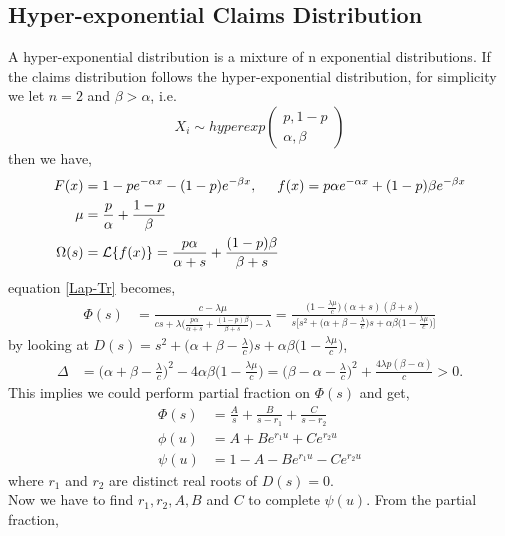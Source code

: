 \documentclass[12pt]{article}
\begin{document}
\subsection{Hyper-exponential Claims Distribution}
A hyper-exponential distribution is a mixture of n exponential distributions. If the claims distribution follows the hyper-exponential distribution, for simplicity we let \(n=2\) and \(\beta>\alpha\), i.e. 
\[X_i\sim hyperexp \begin{pmatrix}{p,1-p}\\{\alpha,\beta}\end{pmatrix}\]
then we have,
\begin{align*}
    F(x)&=1-pe^{-\alpha x}-(1-p)e^{-\beta x},
    \hspace{0.5cm}
    f(x)=p\alpha e^{-\alpha x}+(1-p)\beta e^{-\beta x}\\
    \mu&=\frac{p}{\alpha}+\frac{1-p}{\beta}\\
    \Omega(s)&=\mathcal{L}\{f(x)\}=\frac{p\alpha}{\alpha+s}+\frac{(1-p)\beta}{\beta+s}
\end{align*}
equation \eqref{Lap-Tr} becomes,
\begin{align*}
    \Phi(s)&=\frac{c-\lambda\mu}{cs+\lambda\big(\frac{p\alpha}{\alpha+s}+\frac{(1-p)\beta}{\beta+s}\big)-\lambda}=\frac{\big(1-\frac{\lambda\mu}{c}\big)(\alpha+s)(\beta+s)}{s\big[s^2+\big(\alpha+\beta-\frac{\lambda}{c}\big)s+\alpha\beta\big(1-\frac{\lambda\mu}{c}\big)\big]}
\end{align*}
by looking at $\displaystyle D(s)= s^2+\big(\alpha+\beta-\frac{\lambda}{c}\big)s+\alpha\beta\big(1-\frac{\lambda\mu}{c}\big)$, 
\begin{align*}
    \Delta&=\big(\alpha+\beta-\frac{\lambda}{c}\big)^2-4\alpha\beta\big(1-\frac{\lambda\mu}{c}\big)=\big(\beta-\alpha-\frac{\lambda}{c}\big)^2+\frac{4\lambda p(\beta-\alpha)}{c}>0.
\end{align*}
This implies we could perform partial fraction on \(\Phi(s)\) and get,
\begin{align*}
    \Phi(s)&=\frac{A}{s}+\frac{B}{s-r_1}+\frac{C}{s-r_2}\\
    \phi(u)&=A+Be^{r_1u}+Ce^{r_2u}\\
    \psi(u)&=1-A-Be^{r_1u}-Ce^{r_2u}
\end{align*}
where \(r_1\) and \(r_2\) are distinct real roots of \(D(s)=0\).\\
Now we have to find \(r_1, r_2, A, B\) and \(C\) to complete \(\psi(u)\). From the partial fraction,
\end{document}
